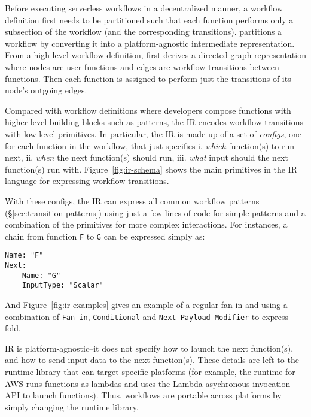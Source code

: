 Before executing serverless workflows in a decentralized manner, a workflow
definition first needs to be partitioned such that each function performs only
a subsection of the workflow (and the corresponding transitions).
% 
%
\name{} partitions a workflow by converting it into a platform-agnostic intermediate
representation. From a high-level workflow definition, \name{} first derives a
directed graph representation where nodes are user functions and edges are
workflow transitions between functions. Then each function is assigned to
perform just the transitions of its node's outgoing edges. 

Compared with workflow definitions where developers compose functions with
higher-level building blocks such as patterns, the \name{} IR encodes workflow
transitions with low-level primitives. In particular, the IR is made up of a
set of \textit{\name{} configs}, one for each function in the workflow, that just
specifies i. \textit{which} function(s) to run next, ii. \textit{when} the
next function(s) should run, iii. \textit{what} input should the next
function(s) run with. Figure~\ref{fig:ir-schema} shows the main primitives in
the \name{} IR language for expressing workflow transitions.

With these \name{} configs, the IR can express all common workflow patterns
(\S\ref{sec:transition-patterns}) using just a few lines of code for simple
patterns and a combination of the primitives for more complex interactions.
For instances, a chain from function \texttt{F} to \texttt{G} can be expressed
simply as:
\begin{verbatim}
Name: "F"
Next:
    Name: "G"
    InputType: "Scalar"
\end{verbatim}

And Figure~\ref{fig:ir-examples} gives an example of a regular fan-in and
using a combination of \texttt{Fan-in}, \texttt{Conditional} and \texttt{Next
Payload Modifier} to express fold.

\name{} IR  is platform-agnostic--it does not specify
how to launch the next function(s), and how to send input data to the next
function(s). These details are left to the \name{} runtime library that can
target specific platforms (for example, the runtime for AWS runs functions as
lambdas and uses the Lambda asychronous invocation API to launch functions).
Thus, workflows are portable across platforms by simply changing the runtime
library.

